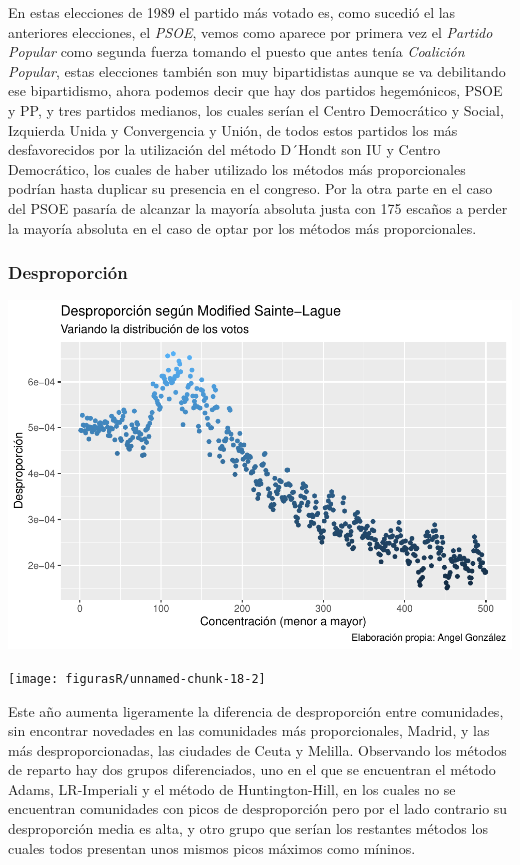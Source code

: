 \documentclass[12pt,a4paper,]{book}
\numberwithin{dummy}{section}
\theoremstyle{ocrenumbox}
\theoremstyle{blacknumex}
\theoremstyle{blacknumbox}
\theoremstyle{ocrenum}
\theoremstyle{ocrenum}
\begin{document}
En estas elecciones de 1989 el partido más votado es, como sucedió el
las anteriores elecciones, el \emph{PSOE}, vemos como aparece por
primera vez el \emph{Partido Popular} como segunda fuerza tomando el
puesto que antes tenía \emph{Coalición Popular}, estas elecciones
también son muy bipartidistas aunque se va debilitando ese bipartidismo,
ahora podemos decir que hay dos partidos hegemónicos, PSOE y PP, y tres
partidos medianos, los cuales serían el Centro Democrático y Social,
Izquierda Unida y Convergencia y Unión, de todos estos partidos los más
desfavorecidos por la utilización del método D´Hondt son IU y Centro
Democrático, los cuales de haber utilizado los métodos más
proporcionales podrían hasta duplicar su presencia en el congreso. Por
la otra parte en el caso del PSOE pasaría de alcanzar la mayoría
absoluta justa con 175 escaños a perder la mayoría absoluta en el caso
de optar por los métodos más proporcionales.

\hypertarget{desproporciuxf3n-4}{%
\subsubsection{Desproporción}\label{desproporciuxf3n-4}}

\begin{center}\includegraphics[width=1\linewidth]{figurasR/unnamed-chunk-18-1} \end{center}

\begin{center}\texttt{[image: figurasR/unnamed-chunk-18-2]} \end{center}

Este año aumenta ligeramente la diferencia de desproporción entre
comunidades, sin encontrar novedades en las comunidades más
proporcionales, Madrid, y las más desproporcionadas, las ciudades de
Ceuta y Melilla. Observando los métodos de reparto hay dos grupos
diferenciados, uno en el que se encuentran el método Adams, LR-Imperiali
y el método de Huntington-Hill, en los cuales no se encuentran
comunidades con picos de desproporción pero por el lado contrario su
desproporción media es alta, y otro grupo que serían los restantes
métodos los cuales todos presentan unos mismos picos máximos como
míninos.
\end{document}
